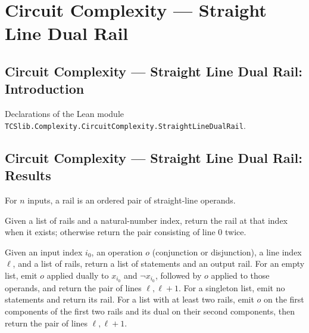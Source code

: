 \section{Circuit Complexity --- Straight Line Dual Rail}
\subsection*{Circuit Complexity --- Straight Line Dual Rail: Introduction}

Declarations of the Lean module \texttt{TCSlib.Complexity.CircuitComplexity.StraightLineDualRail}.

\subsection*{Circuit Complexity --- Straight Line Dual Rail: Results}

\begin{definition}[Rail]
\label{BoolCircuit.StraightLine.Rail}
\leanok
{}
For $n$ inputs, a rail is an ordered pair of straight-line operands.
\end{definition}

\begin{definition}
\label{BoolCircuit.StraightLine.railAt}
\leanok
{}
Given a list of rails and a natural-number index, return the rail at that index when it
exists; otherwise return the pair consisting of line $0$ twice.
\end{definition}

\begin{definition}
\label{BoolCircuit.StraightLine.emitOp}
\leanok
{}
Given an input index $i_0$, an operation $o$ (conjunction or disjunction), a line index
$\ell$, and a list of rails, return a list of statements and an output rail. For an
empty list, emit $o$ applied dually to $x_{i_0}$ and $\neg x_{i_0}$, followed by $o$
applied to those operands, and return the pair of lines $\ell,\ell+1$. For a singleton
list, emit no statements and return its rail. For a list with at least two rails, emit
$o$ on the first components of the first two rails and its dual on their second
components, then return the pair of lines $\ell,\ell+1$.
\end{definition}

